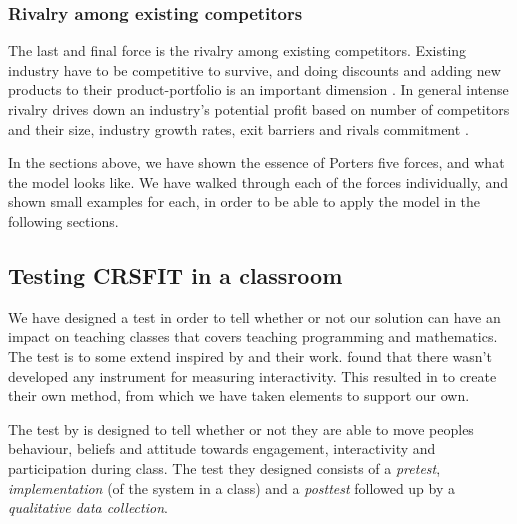 \subsubsection*{Rivalry among existing competitors}
The last and final force is the rivalry among existing competitors. Existing industry have to be competitive to survive, and doing discounts and adding new products to their product-portfolio is an important dimension \cite[p.~85]{porter2008five}. In general intense rivalry drives down an industry's potential profit based on number of competitors and their size, industry growth rates, exit barriers and rivals commitment \cite[p.~85]{porter2008five}. 


In the sections above, we have shown the essence of Porters five forces, and what the model looks like. We have walked through each of the forces individually, and shown small examples for each, in order to be able to apply the model in the following sections.


































\subsection{Testing CRSFIT in a classroom}\label{sec:testingcrs}
We have designed a test in order to tell whether or not our solution can have an impact on teaching classes that covers teaching programming and mathematics. The test is to some extend inspired by \cite{siau2006use} and their work.  found that there wasn't developed any instrument for measuring interactivity. This resulted in  to create their own method, from which we have taken elements to support our own.

The test by  is designed to tell whether or not they are able to move peoples behaviour, beliefs and attitude towards engagement, interactivity and participation during class. The test they designed consists of a \emph{pretest}, \emph{implementation} (of the system in a class) and a \emph{posttest} followed up by a \emph{qualitative data collection}. 


